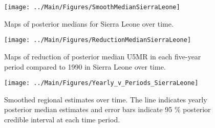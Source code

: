 \documentclass[12pt]{article}\usepackage[]{graphicx}\usepackage[]{color}
\newenvironment{knitrout}{}{} %
\begin{document}
\begin{knitrout}
\color{fgcolor}\begin{figure}[bht]

{\centering \texttt{[image: ../Main/Figures/SmoothMedianSierraLeone]} 

}

\caption[Maps of posterior medians for Sierra Leone  over time]{Maps of posterior medians for Sierra Leone  over time.}\label{fig:unnamed-chunk-294}
\end{figure}


\end{knitrout}
\begin{knitrout}
\color{fgcolor}\begin{figure}[bht]

{\centering \texttt{[image: ../Main/Figures/ReductionMedianSierraLeone]} 

}

\caption[Maps of reduction of posterior median U5MR in each five-year period compared to 1990 in Sierra Leone over time]{Maps of reduction of posterior median U5MR in each five-year period compared to 1990 in Sierra Leone over time.}\label{fig:unnamed-chunk-295}
\end{figure}


\end{knitrout}
\begin{knitrout}
\color{fgcolor}\begin{figure}[bht]

{\centering \texttt{[image: ../Main/Figures/Yearly\_v\_Periods\_SierraLeone]} 

}

\caption[Smoothed regional estimates over time]{Smoothed regional estimates over time. The line indicates yearly posterior median estimates and error bars indicate 95 \% posterior credible interval at each time period.}\label{fig:unnamed-chunk-296}
\end{figure}


\end{knitrout}
\end{document}
